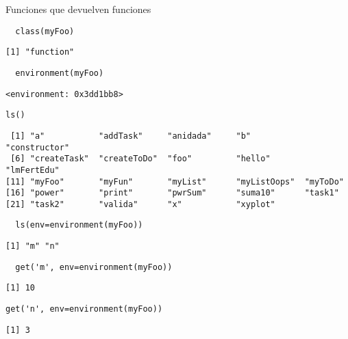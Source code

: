 \documentclass[xcolor={usenames,svgnames,dvipsnames}]{beamer}
\begin{document}
\begin{frame}[fragile,label={sec:orgheadline18}]{Funciones que devuelven funciones}
 \lstset{language=R,label= ,caption= ,captionpos=b,numbers=none}
\begin{lstlisting}
  class(myFoo)
\end{lstlisting}

\begin{verbatim}
[1] "function"
\end{verbatim}

\lstset{language=R,label= ,caption= ,captionpos=b,numbers=none}
\begin{lstlisting}
  environment(myFoo)
\end{lstlisting}

\begin{verbatim}
<environment: 0x3dd1bb8>
\end{verbatim}

\lstset{language=R,label= ,caption= ,captionpos=b,numbers=none}
\begin{lstlisting}
ls()
\end{lstlisting}

\begin{verbatim}
 [1] "a"           "addTask"     "anidada"     "b"           "constructor"
 [6] "createTask"  "createToDo"  "foo"         "hello"       "lmFertEdu"  
[11] "myFoo"       "myFun"       "myList"      "myListOops"  "myToDo"     
[16] "power"       "print"       "pwrSum"      "suma10"      "task1"      
[21] "task2"       "valida"      "x"           "xyplot"
\end{verbatim}

\lstset{language=R,label= ,caption= ,captionpos=b,numbers=none}
\begin{lstlisting}
  ls(env=environment(myFoo))
\end{lstlisting}

\begin{verbatim}
[1] "m" "n"
\end{verbatim}

\lstset{language=R,label= ,caption= ,captionpos=b,numbers=none}
\begin{lstlisting}
  get('m', env=environment(myFoo))
\end{lstlisting}

\begin{verbatim}
[1] 10
\end{verbatim}

\lstset{language=R,label= ,caption= ,captionpos=b,numbers=none}
\begin{lstlisting}
get('n', env=environment(myFoo))
\end{lstlisting}

\begin{verbatim}
[1] 3
\end{verbatim}
\end{frame}
\end{document}

